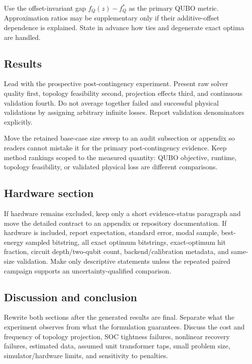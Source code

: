 \documentclass[11pt]{article}
\begin{document}
Use the offset-invariant gap $f_Q(z)-f_Q^*$ as the primary QUBO metric.
Approximation ratios may be supplementary only if their additive-offset
dependence is explained.  State in advance how ties and degenerate exact
optima are handled.

\subsection*{Results}

Lead with the prospective post-contingency experiment.  Present raw solver
quality first, topology feasibility second, projection effects third, and
continuous validation fourth.  Do not average together failed and successful
physical validations by assigning arbitrary infinite losses.  Report
validation denominators explicitly.

Move the retained base-case size sweep to an audit subsection or appendix so
readers cannot mistake it for the primary post-contingency evidence.  Keep
method rankings scoped to the measured quantity: QUBO objective, runtime,
topology feasibility, or validated physical loss are different comparisons.

\subsection*{Hardware section}

If hardware remains excluded, keep only a short evidence-status paragraph and
move the detailed contract to an appendix or repository documentation.  If
hardware is included, report expectation, standard error, modal sample,
best-energy sampled bitstring, all exact optimum bitstrings, exact-optimum hit
fraction, circuit depth/two-qubit count, backend/calibration metadata, and
same-size validation.  Make only descriptive statements unless the repeated
paired campaign supports an uncertainty-qualified comparison.

\subsection*{Discussion and conclusion}

Rewrite both sections after the generated results are final.  Separate what
the experiment observes from what the formulation guarantees.  Discuss the
cost and frequency of topology projection, SOC tightness failures, nonlinear
recovery failures, estimated data, assumed unit transformer taps, small
problem size, simulator/hardware limits, and sensitivity to penalties.
\end{document}
